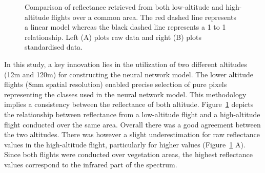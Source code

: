 \documentclass[
  number]{elsarticle}
\begin{document}
\label{cell-fig-CompareRef}
\begin{figure}[H]


\caption{\label{fig-CompareRef}Comparison of reflectance retrieved from
both low-altitude and high-altitude flights over a common area. The red
dashed line represents a linear model whereas the black dashed line
represents a 1 to 1 relationship. Left (A) plots raw data and right (B)
plots standardised data.}

\end{figure}%

In this study, a key innovation lies in the utilization of two different
altitudes (12m and 120m) for constructing the neural network model. The
lower altitude flights (8mm spatial resolution) enabled precise
selection of pure pixels representing the classes used in the neural
network model. This methodology implies a consistency between the
reflectance of both altitude. Figure~\ref{fig-CompareRef} depicts the
relationship between reflectance from a low-altitude flight and a
high-altitude flight conducted over the same area. Overall there was a
good agreement between the two altitudes. There was however a slight
underestimation for raw reflectance values in the high-altitude flight,
particularly for higher values (Figure~\ref{fig-CompareRef} A). Since
both flights were conducted over vegetation areas, the highest
reflectance values correspond to the infrared part of the spectrum.
\end{document}
